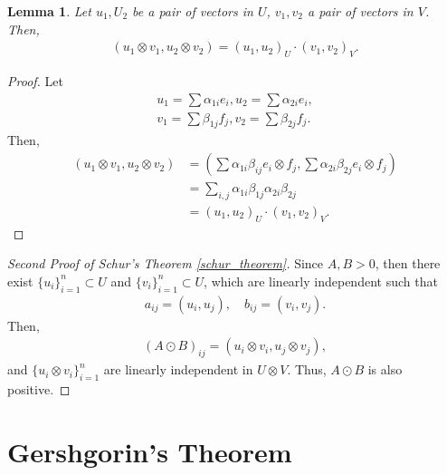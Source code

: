 \documentclass[11pt]{book}
\newtheorem{lemma}[theorem]{Lemma}
\theoremstyle{definition}
\numberwithin{equation}{chapter}
\begin{document}
\begin{subappendices}
\begin{lemma}
Let $u_1, U_2$ be a pair of vectors in $U$, $v_1, v_2$ a pair of vectors in $V$. Then,
\begin{align*}
    (u_1 \otimes v_1, u_2 \otimes v_2) = (u_1, u_2)_U \cdot (v_1, v_2)_V.
\end{align*}
\end{lemma}
\begin{proof}
Let
\begin{align*}
    u_1 = \sum \alpha_{1i} e_i, u_2 = \sum \alpha_{2i} e_i, \\
    v_1 = \sum \beta_{1j} f_j, v_2 = \sum \beta_{2j} f_j.
\end{align*}
Then, 
\begin{align*}
    (u_1 \otimes v_1, u_2 \otimes v_2) & = \left(\sum \alpha_{1i} \beta_{ij} e_i \otimes f_j, \sum \alpha_{2i} \beta_{2j} e_i \otimes f_j \right) \\
    & = \sum_{i,j} \alpha_{1i} \beta_{1j} \alpha_{2i} \beta_{2j} \\
    & = (u_1, u_2)_U \cdot (v_1, v_2)_V.
\end{align*}
\end{proof}

\medskip

\begin{proof}[Second Proof of Schur's Theorem \ref{schur_theorem}]
Since $A, B > 0$, then there exist $\{u_i\}^n_{i=1} \subset U$ and $\{v_i\}^n_{i=1} \subset U$, which are linearly independent such that
\begin{align*}
    a_{ij} = (u_i, u_j), \quad b_{ij} = (v_i, v_j).
\end{align*}
Then, 
\begin{align*}
    (A \odot B)_{ij} = \left(u_i \otimes v_i, u_j \otimes v_j \right),
\end{align*}
and $\{u_i \otimes v_i\}^n_{i=1}$ are linearly independent in $U \otimes V$. Thus, $A \odot B$ is also positive.
\end{proof}

\section{Gershgorin's Theorem}


\end{subappendices}
\end{document}
